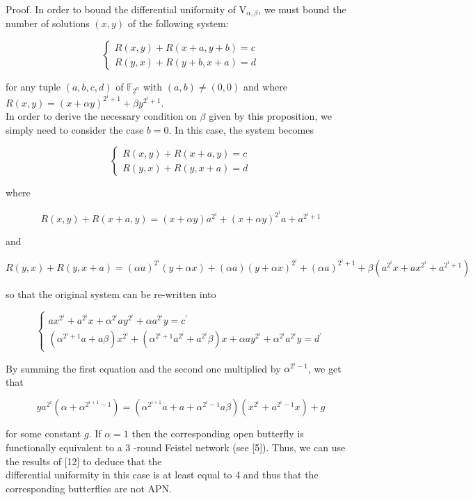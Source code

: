 \documentclass[10pt]{article}
\begin{document}
Proof. In order to bound the differential uniformity of $\mathrm{V}_{\alpha, \beta}$, we must bound the number of solutions $(x, y)$ of the following system:

$$
\left\{\begin{array}{l}
R(x, y)+R(x+a, y+b)=c \\
R(y, x)+R(y+b, x+a)=d
\end{array}\right.
$$

for any tuple $(a, b, c, d)$ of $\mathbb{F}_{2^{n}}$ with $(a, b) \neq(0,0)$ and where $R(x, y)=(x+\alpha y)^{2^{i}+1}+\beta y^{2^{i}+1}$.\\
In order to derive the necessary condition on $\beta$ given by this proposition, we simply need to consider the case $b=0$. In this case, the system becomes

$$
\left\{\begin{array}{l}
R(x, y)+R(x+a, y)=c \\
R(y, x)+R(y, x+a)=d
\end{array}\right.
$$

where

$$
R(x, y)+R(x+a, y)=(x+\alpha y) a^{2^{i}}+(x+\alpha y)^{2^{i}} a+a^{2^{i}+1}
$$

and

$$
R(y, x)+R(y, x+a)=(\alpha a)^{2^{i}}(y+\alpha x)+(\alpha a)(y+\alpha x)^{2^{i}}+(\alpha a)^{2^{i}+1}+\beta\left(a^{2^{i}} x+a x^{2^{i}}+a^{2^{i}+1}\right)
$$

so that the original system can be re-written into

\[
\left\{\begin{array}{l}
a x^{2^{i}}+a^{2^{i}} x+\alpha^{2^{i}} a y^{2^{i}}+\alpha a^{2^{i}} y=c^{\prime}  \tag{1}\\
\left(\alpha^{2^{i}+1} a+a \beta\right) x^{2^{i}}+\left(\alpha^{2^{i}+1} a^{2^{i}}+a^{2^{i}} \beta\right) x+\alpha a y^{2^{i}}+\alpha^{2^{i}} a^{2^{i}} y=d^{\prime}
\end{array}\right.
\]

By summing the first equation and the second one multiplied by $\alpha^{2^{i}-1}$, we get that

$$
y a^{2^{i}}\left(\alpha+\alpha^{2^{i+1}-1}\right)=\left(\alpha^{2^{i+1}} a+a+\alpha^{2^{i}-1} a \beta\right)\left(x^{2^{i}}+a^{2^{i}-1} x\right)+g
$$

for some constant $g$. If $\alpha=1$ then the corresponding open butterfly is functionally equivalent to a 3 -round Feistel network (see [5]). Thus, we can use the results of [12] to deduce that the\\
differential uniformity in this case is at least equal to 4 and thus that the corresponding butterflies are not APN.
\end{document}
